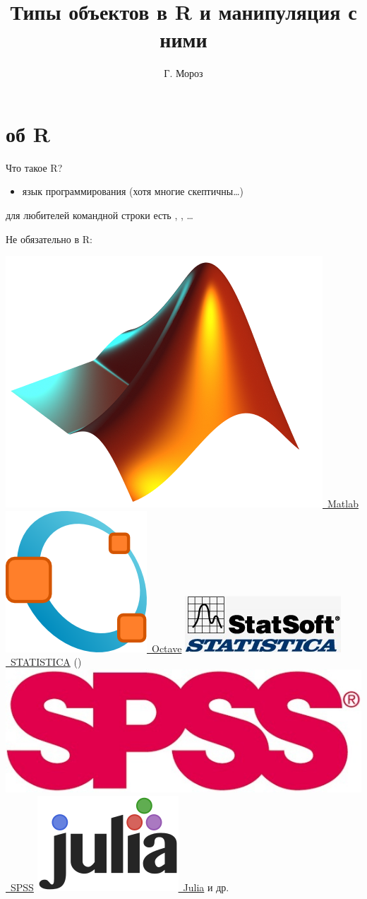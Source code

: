 
\title[]{Типы объектов в R и манипуляция с ними}
\author[]{Г. Мороз}
\date{}

\frame{\titlepage}
\section{об R}
\begin{frame}{Что  такое R?}
\begin{itemize}
\mytem среда для статистического анализа, обработки и визуализации данных
\item[\texttt{\symbol{"1F63C}}] язык программирования \pause (хотя многие скептичны\dots)
\end{itemize}
\begin{itemize}
\mytem \href{http://www.r-project.org/}{{\color{red!13!blue}{скачать R}}}
\mytem \href{http://www.rstudio.com/}{{\color{red!13!blue}{скачать RStudio}}}
\mytem для любителей командной строки есть \href{http://dirk.eddelbuettel.com/code/littler.html}{{\color{red!13!blue}{\verb"littler"}}}
\mytem \href{http://sourceforge.net/projects/npptor/}{{\color{red!13!blue}{R in Notepad ++}}}, \href{http://manuals.bioinformatics.ucr.edu/home/programming-in-r/vim-r}{{\color{red!13!blue}{Vim-R-Tmux}}}, \href{https://rkward.kde.org/}{{\color{red!13!blue}{RKWard}}}\dots
\end{itemize}
\pause Не обязательно в R:\\
\begin{itemize}
\mytem \href{http://www.mathworks.com/products/matlab/}{\includegraphics[height=2ex]{matlab.jpg}~Matlab}
\mytem \href{https://www.gnu.org/software/octave/}{\includegraphics[height=2.7ex]{octave.png}~Octave}
\mytem \href{http://www.statsoft.ru/}{\includegraphics[height=2.3ex]{statistica.jpg}~STATISTICA} (\href{http://www.statosphere.ru/home.html}{{\color{red!13!blue}{и русский блог об этой программе}}})
\mytem \href{http://www-01.ibm.com/software/analytics/spss/}{\includegraphics[height=2ex]{spss.jpg}~SPSS}
\mytem \href{http://juliastats.github.io/}{\includegraphics[height=2.7ex]{julia.png}~Julia}
\mytem и др.
\end{itemize}
\end{frame}
